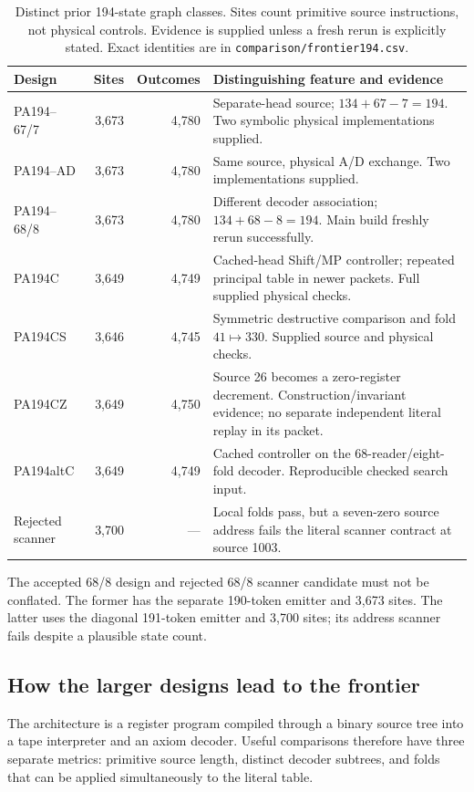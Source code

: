\documentclass[11pt,letterpaper]{article}
\newcommand{\file}[1]{{\small\nolinkurl{#1}}}
\begin{document}
\begin{table}[ht]
\centering\small
\begin{tabularx}{\linewidth}{@{}lrrX@{}}
\toprule
Design & Sites & Outcomes & Distinguishing feature and evidence\\
\midrule
PA194--67/7 & 3,673 & 4,780 &
Separate-head source; $134+67-7=194$.
Two symbolic physical implementations supplied.\\
PA194--AD & 3,673 & 4,780 &
Same source, physical A/D exchange.
Two implementations supplied.\\
PA194--68/8 & 3,673 & 4,780 &
Different decoder association; $134+68-8=194$.
Main build freshly rerun successfully.\\
PA194C & 3,649 & 4,749 &
Cached-head Shift/MP controller; repeated principal table
in newer packets. Full supplied physical checks.\\
PA194CS & 3,646 & 4,745 &
Symmetric destructive comparison and fold $41\mapsto330$.
Supplied source and physical checks.\\
PA194CZ & 3,649 & 4,750 &
Source 26 becomes a zero-register decrement.
Construction/invariant evidence; no separate independent
literal replay in its packet.\\
PA194altC & 3,649 & 4,749 &
Cached controller on the 68-reader/eight-fold decoder.
Reproducible checked search input.\\
Rejected scanner & 3,700 & --- &
Local folds pass, but a seven-zero source address fails
the literal scanner contract at source 1003.\\
\bottomrule
\end{tabularx}
\caption{Distinct prior 194-state graph classes. Sites count primitive
source instructions, not physical controls. Evidence is supplied
unless a fresh rerun is explicitly stated. Exact identities are in
\file{comparison/frontier194.csv}.}
\label{tab:frontier}
\end{table}

The accepted 68/8 design and rejected 68/8 scanner candidate must not
be conflated. The former has the separate 190-token emitter and 3,673
sites. The latter uses the diagonal 191-token emitter and 3,700 sites;
its address scanner fails despite a plausible state count.

\subsection{How the larger designs lead to the frontier}

The architecture is a register program compiled through a binary source
tree into a tape interpreter and an axiom decoder. Useful comparisons
therefore have three separate metrics: primitive source length,
distinct decoder subtrees, and folds that can be applied simultaneously
to the literal table.
\end{document}
